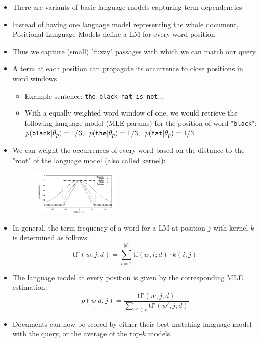 \begin{itemize}
	\item There are variants of basic language models capturing term dependencies
	\item Instead of having one language model representing the whole document, Positional Language Models define a LM for every word position
	\item Thus we capture (small) "fuzzy" passages with which we can match our query
	\item A term at each position can propagate its occurrence to close positions in word windows
	\begin{itemize}
		\item Example sentence: \texttt{the black hat is not}...
		\item With a equally weighted word window of one, we would retrieve the following language model (MLE params) for the position of word "\texttt{black}": $p(\texttt{black}|\theta_p) = 1/3, \hspace{2mm} p(\texttt{the}|\theta_p) = 1/3, \hspace{2mm} p(\texttt{hat}|\theta_p) = 1/3$
	\end{itemize}
	\item We can weight the occurrences of every word based on the distance to the "root" of the language model (also called kernel):
	\begin{figure}[ht]
		\centering
		\includegraphics[width=0.4\textwidth]{figures/language_models_positional.png}
		\label{img:language_models_positional}
	\end{figure}
	\item In general, the term frequency of a word for a LM at position $j$ with kernel $k$ is determined as follows:
	$$\text{tf'}(w,j;d) = \sum\limits_{i=1}^{|d|} \text{tf}(w,i;d) \cdot k(i,j) $$
	\item The language model at every position is given by the corresponding MLE estimation:
	$$p(w|d,j) = \frac{\text{tf'}(w,j;d)}{\sum_{w'\in V} \text{tf'}(w',j;d)}$$
	\item Documents can now be scored by either their best matching language model with the query, or the average of the top-$k$ models
\end{itemize}